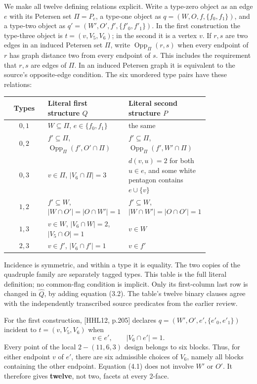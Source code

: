 We make all twelve defining relations explicit. Write a type-zero object as an edge $e$ with its Petersen set $\Pi=P_e$, a type-one object as $q=(W,O,f,\{f_0,f_1\})$, and a type-two object as $q'=(W',O',f',\{f'_0,f'_1\})$. In the first construction the type-three object is $t=(v,V_5,V_6)$; in the second it is a vertex $v$. If $r,s$ are two edges in an induced Petersen set $\Pi$, write $\operatorname{Opp}_{\Pi}(r,s)$ when every endpoint of $r$ has graph distance two from every endpoint of $s$. This includes the requirement that $r,s$ are edges of $\Pi$. In an induced Petersen graph it is equivalent to the source's opposite-edge condition. The six unordered type pairs have these relations:
\begin{center}\small
\begin{tabular}{c p{0.405\linewidth} p{0.405\linewidth}}
\toprule Types & Literal first structure $Q$ & Literal second structure $P$\\\midrule
$0,1$ & $W\subseteq\Pi$, $e\in\{f_0,f_1\}$ & the same\\[3pt]
$0,2$ & $f'\subseteq\Pi$, $\operatorname{Opp}_{\Pi}(f',O'\cap\Pi)$ & $f'\subseteq\Pi$, $\operatorname{Opp}_{\Pi}(f',W'\cap\Pi)$\\[3pt]
$0,3$ & $v\in\Pi$, $|V_6\cap\Pi|=3$ & $d(v,u)=2$ for both $u\in e$, and some white pentagon contains $e\cup\{v\}$\\[3pt]
$1,2$ & $f'\subseteq W$, $|W\cap O'|=|O\cap W'|=1$ & $f'\subseteq W$, $|W\cap W'|=|O\cap O'|=1$\\[3pt]
$1,3$ & $v\in W$, $|V_6\cap W|=2$, $|V_5\cap O|=1$ & $v\in W$\\[3pt]
$2,3$ & $v\in f'$, $|V_6\cap f'|=1$ & $v\in f'$\\\bottomrule
\end{tabular}
\end{center}
Incidence is symmetric, and within a type it is equality. The two copies of the quadruple family are separately tagged types. This table is the full literal definition; no common-flag condition is implicit. Only its first-column last row is changed in $\widehat Q$, by adding equation (3.2). The table's twelve binary clauses agree with the independently transcribed source predicates from the earlier review.

For the first construction, {[}HHL12, p.205{]} declares
\(q=(W',O',e',\{e'_0,e'_1\})\) incident to \(t=(v,V_5,V_6)\) when \[
 v\in e',\qquad |V_6\cap e'|=1.
 \tag{4.1}
\] Every point of the local \(2\!-(11,6,3)\) design belongs to six
blocks. Thus, for either endpoint \(v\) of \(e'\), there are six
admissible choices of \(V_6\), namely all blocks containing the other
endpoint. Equation (4.1) does not involve \(W'\) or \(O'\). It therefore
gives \textbf{twelve}, not two, facets at every 2-face.

